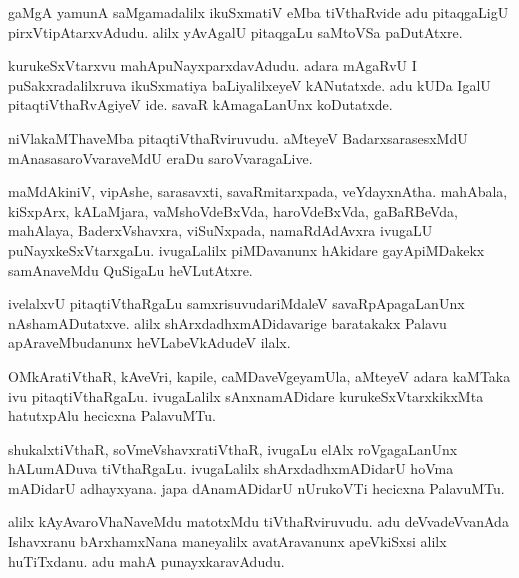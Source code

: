 \documentclass{article}
\begin{document}
\begin{mn}%
gaMgA yamunA saMgamadalilx ikuSxmatiV eMba tiVthaRvide adu pitaqgaLigU
pirxVtipAtarxvAdudu. alilx yAvAgalU pitaqgaLu saMtoVSa paDutAtxre.
\end{mn}

\begin{mn}%
kurukeSxVtarxvu mahApuNayxparxdavAdudu. adara mAgaRvU I
puSakxradalilxruva ikuSxmatiya baLiyalilxeyeV kANutatxde. adu kUDa
IgalU pitaqtiVthaRvAgiyeV ide. savaR kAmagaLanUnx koDutatxde.
\end{mn}

\begin{mn}
niVlakaMThaveMba pitaqtiVthaRviruvudu. aMteyeV BadarxsarasesxMdU
mAnasasaroVvaraveMdU eraDu saroVvaragaLive.
\end{mn}

\begin{mn}%
maMdAkiniV, vipAshe, sarasavxti, savaRmitarxpada,
veYdayxnAtha. mahAbala, kiSxpArx, kALaMjara, vaMshoVdeBxVda,
haroVdeBxVda, gaBaRBeVda, mahAlaya, BaderxVshavxra, viSuNxpada,
namaRdAdAvxra ivugaLU puNayxkeSxVtarxgaLu. ivugaLalilx piMDavanunx
hAkidare gayApiMDakekx samAnaveMdu QuSigaLu heVLutAtxre.
\end{mn}

\begin{mn}
ivelalxvU pitaqtiVthaRgaLu samxrisuvudariMdaleV savaRpApagaLanUnx
nAshamADutatxve. alilx shArxdadhxmADidavarige baratakakx Palavu
apAraveMbudanunx heVLabeVkAdudeV ilalx.
\end{mn}

\begin{mn}%
OMkAratiVthaR, kAveVri, kapile, caMDaveVgeyamUla, aMteyeV adara
kaMTaka ivu pitaqtiVthaRgaLu. ivugaLalilx sAnxnamADidare
kurukeSxVtarxkikxMta hatutxpAlu hecicxna PalavuMTu.
\end{mn}

\begin{mn}%
shukalxtiVthaR, soVmeVshavxratiVthaR, ivugaLu elAlx roVgagaLanUnx
hALumADuva tiVthaRgaLu. ivugaLalilx shArxdadhxmADidarU hoVma mADidarU
adhayxyana. japa dAnamADidarU nUrukoVTi hecicxna PalavuMTu.
\end{mn}

\begin{mn}%
alilx kAyAvaroVhaNaveMdu matotxMdu tiVthaRviruvudu. adu deVvadeVvanAda
Ishavxranu bArxhamxNana  maneyalilx avatAravanunx apeVkiSxsi alilx
huTiTxdanu. adu mahA punayxkaravAdudu.
\end{mn}
\end{document}
